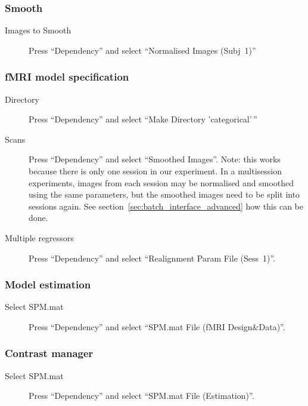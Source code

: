 \subsubsection*{Smooth}

\begin{description}
\item[Images to Smooth] Press ``Dependency'' and select ``Normalised Images
  (Subj~1)''
\end{description}

\subsubsection*{fMRI model specification}

\begin{description}
\item[Directory] Press ``Dependency'' and select ``Make Directory
  'categorical'\,''
\item[Scans] Press ``Dependency'' and select ``Smoothed Images''. Note: this
  works because there is only one session in our experiment. In a
  multisession experiments, images from each session may be normalised and
  smoothed using the same parameters, but the smoothed images need to be
  split into sessions again. See section~\ref{sec:batch_interface_advanced}
  how this can be done.
\item[Multiple regressors] Press ``Dependency'' and select ``Realignment
  Param File (Sess~1)''.
\end{description}

\subsubsection*{Model estimation}

\begin{description}
\item[Select SPM.mat] Press ``Dependency'' and select ``SPM.mat File (fMRI
  Design\&Data)''.
\end{description}

\subsubsection*{Contrast manager}

\begin{description}
\item[Select SPM.mat] Press ``Dependency'' and select ``SPM.mat File
  (Estimation)''. 
\end{description}


